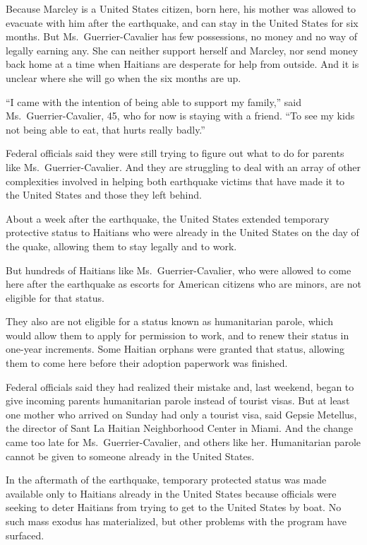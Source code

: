 ﻿\documentclass[12pt]{article}
\begin{document}
Because Marcley is a United States citizen, born here, his mother was allowed to evacuate with him
after the earthquake, and can stay in the United States for six months. But Ms.~Guerrier-Cavalier
has few possessions, no money and no way of legally earning any. She can neither support herself and
Marcley, nor send money back home at a time when Haitians are desperate for help from outside. And
it is unclear where she will go when the six months are up.

``I came with the intention of being able to support my family,'' said Ms.~Guerrier-Cavalier, 45,
who for now is staying with a friend. ``To see my kids not being able to eat, that hurts really
badly.''

Federal officials said they were still trying to figure out what to do for parents like
Ms.~Guerrier-Cavalier. And they are struggling to deal with an array of other complexities involved
in helping both earthquake victims that have made it to the United States and those they left
behind.

About a week after the earthquake, the United States extended temporary protective status to
Haitians who were already in the United States on the day of the quake, allowing them to stay
legally and to work.

But hundreds of Haitians like Ms.~Guerrier-Cavalier, who were allowed to come here after the
earthquake as escorts for American citizens who are minors, are not eligible for that status.

They also are not eligible for a status known as humanitarian parole, which would allow them to
apply for permission to work, and to renew their status in one-year increments. Some Haitian orphans
were granted that status, allowing them to come here before their adoption paperwork was finished.

Federal officials said they had realized their mistake and, last weekend, began to give incoming
parents humanitarian parole instead of tourist visas. But at least one mother who arrived on Sunday
had only a tourist visa, said Gepsie Metellus, the director of Sant La Haitian Neighborhood Center
in Miami. And the change came too late for Ms.~Guerrier-Cavalier, and others like her. Humanitarian
parole cannot be given to someone already in the United States.

In the aftermath of the earthquake, temporary protected status was made available only to Haitians
already in the United States because officials were seeking to deter Haitians from trying to get to
the United States by boat. No such mass exodus has materialized, but other problems with the program
have surfaced.
\end{document}
